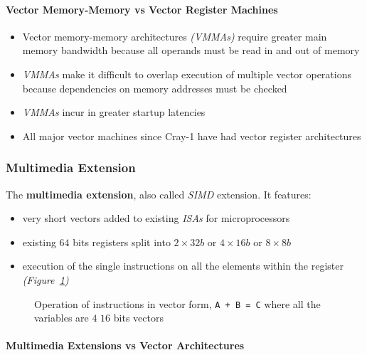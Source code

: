 \documentclass[english]{article}
\begin{document}
\paragraph{Vector Memory-Memory vs Vector Register Machines}

\begin{itemize}
  \item Vector memory-memory architectures \textit{(VMMAs)} require greater main memory bandwidth because all operands must be read in and out of memory
  \item \textit{VMMAs} make it difficult to overlap execution of multiple vector operations because dependencies on memory addresses must be checked
  \item \textit{VMMAs} incur in greater startup latencies
  \item All major vector machines since Cray-1 have had vector register architectures
\end{itemize}

\subsubsection{Multimedia Extension}

The \textbf{multimedia extension}, also called \textit{SIMD} extension. It features:

\begin{itemize}
  \item very short vectors added to existing \textit{ISAs} for microprocessors
  \item existing \(64\) bits registers split into \(2 \times 32 b\) or \(4 \times 16 b\) or \(8 \times 8 b\)
  \item execution of the single instructions on all the elements within the register \textit{(Figure~\ref{fig:operations-in-vector-form})}
\end{itemize}

\begin{figure}[htbp]
  \bigskip
  \centering
  \caption{Operation of instructions in vector form, \texttt{A + B = C} where all the variables are \(4\) \(16\) bits vectors}
  \label{fig:operations-in-vector-form}
  \bigskip
\end{figure}

\paragraph{Multimedia Extensions vs Vector Architectures}
\end{document}
